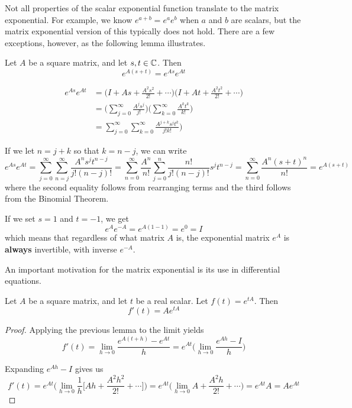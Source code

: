 Not all properties of the scalar exponential function translate to the matrix exponential. For example, we know $e^{a + b} = e^{a} e^{b}$ when $a$ and $b$ are scalars, but the matrix exponential version of this typically does not hold. There are a few exceptions, however, as the following lemma illustrates. 

\begin{lemma}
Let $A$ be a square matrix, and let $s, t \in \mathbb{C}$. Then 
$$e^{A(s + t)} = e^{As} e^{At}$$
\end{lemma} 

\begin{lproof}
$$
\begin{aligned}
e^{As} e^{At} &= \Big( I + As + \frac{A^{2} s^{2}}{2!} + \cdots \Big) \Big( I + At + \frac{A^{2} t^{2}}{2!} + \cdots \Big) \\
&= \Big( \sum_{j=0}^{\infty} \frac{A^{j} s^{j}}{j!} \Big) \Big( \sum_{k=0}^{\infty} \frac{A^{k} t^{k}}{k!} \Big) \\
&= \sum_{j=0}^{\infty} \sum_{k=0}^{\infty} \frac{A^{j + k} s^{j} t^{k}}{j! k!} \Big)
\end{aligned}
$$

If we let $n = j + k$ so that $k = n - j$, we can write 
$$e^{As} e^{At} = \sum_{j=0}^{\infty} \sum_{n=j}^{\infty} \frac{A^{n} s^{j} t^{n - j}}{j! (n - j)!} = \sum_{n=0}^{\infty} \frac{A^{n}}{n!} \sum_{j=0}^{n} \frac{n!}{j! (n - j)!} s^{j} t^{n-j} = \sum_{n=0}^{\infty} \frac{A^{n} (s + t)^{n}}{n!} = e^{A(s +t)}$$
where the second equality follows from rearranging terms and the third follows from the Binomial Theorem. 
\end{lproof}

If we set $s = 1$ and $t = -1$, we get 
$$e^{A} e^{-A} = e^{A(1 - 1)} = e^{0} = I$$
which means that regardless of what matrix $A$ is, the exponential matrix $e^{A}$ is \textbf{always} invertible, with inverse $e^{-A}$. 

An important motivation for the matrix exponential is its use in differential equations. 

\begin{theorem}
Let $A$ be a square matrix, and let $t$ be a real scalar. Let $f(t) = e^{tA}$. Then $$f'(t) = Ae^{tA}$$ 
\end{theorem}

\begin{proof}
Applying the previous lemma to the limit yields 
$$f'(t) = \lim_{h \rightarrow 0} \frac{e^{A(t+h)} - e^{At}}{h} = e^{At} \Big( \lim_{h \rightarrow 0} \frac{e^{Ah} - I}{h} \Big)$$

Expanding $e^{Ah} - I$ gives us 
$$f'(t) = e^{At} \Big( \lim_{h \rightarrow 0} \frac{1}{h} \Big[ Ah + \frac{A^{2} h^{2}}{2!} + \cdots \Big] \Big)= e^{At} \Big( \lim_{h \rightarrow 0} A + \frac{A^{2} h}{2!} + \cdots \Big) = e^{At} A = Ae^{At}$$
\end{proof}

